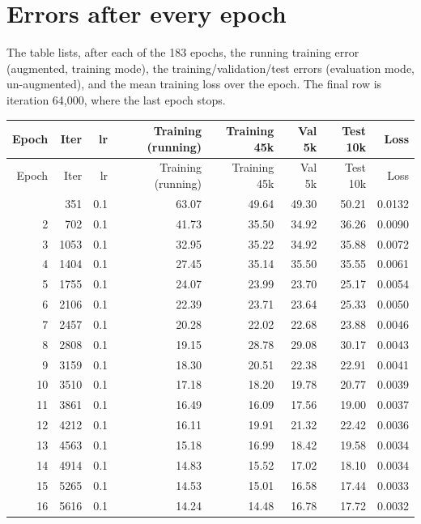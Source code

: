 \documentclass[11pt,a4paper]{article}
\begin{document}
\section{Errors after every epoch}

The table lists, after each of the 183 epochs, the running training error
(augmented, training mode), the training/validation/test errors (evaluation
mode, un-augmented), and the mean training loss over the epoch. The final row
is iteration 64{,}000, where the last epoch stops.

\begin{center}
\footnotesize
\begin{longtable}{@{}rrrrrrrr@{}}
\toprule
Epoch & Iter & lr & Training (running) & Training 45k & Val 5k & Test 10k & Loss \\
\midrule
\endfirsthead
\toprule
Epoch & Iter & lr & Training (running) & Training 45k & Val 5k & Test 10k & Loss \\
\midrule
\endhead
\bottomrule
\endfoot
1 & 351 & 0.1 & 63.07 & 49.64 & 49.30 & 50.21 & 0.0132 \\
2 & 702 & 0.1 & 41.73 & 35.50 & 34.92 & 36.26 & 0.0090 \\
3 & 1053 & 0.1 & 32.95 & 35.22 & 34.92 & 35.88 & 0.0072 \\
4 & 1404 & 0.1 & 27.45 & 35.14 & 35.50 & 35.55 & 0.0061 \\
5 & 1755 & 0.1 & 24.07 & 23.99 & 23.70 & 25.17 & 0.0054 \\
6 & 2106 & 0.1 & 22.39 & 23.71 & 23.64 & 25.33 & 0.0050 \\
7 & 2457 & 0.1 & 20.28 & 22.02 & 22.68 & 23.88 & 0.0046 \\
8 & 2808 & 0.1 & 19.15 & 28.78 & 29.08 & 30.17 & 0.0043 \\
9 & 3159 & 0.1 & 18.30 & 20.51 & 22.38 & 22.91 & 0.0041 \\
10 & 3510 & 0.1 & 17.18 & 18.20 & 19.78 & 20.77 & 0.0039 \\
11 & 3861 & 0.1 & 16.49 & 16.09 & 17.56 & 19.00 & 0.0037 \\
12 & 4212 & 0.1 & 16.11 & 19.91 & 21.32 & 22.42 & 0.0036 \\
13 & 4563 & 0.1 & 15.18 & 16.99 & 18.42 & 19.58 & 0.0034 \\
14 & 4914 & 0.1 & 14.83 & 15.52 & 17.02 & 18.10 & 0.0034 \\
15 & 5265 & 0.1 & 14.53 & 15.01 & 16.58 & 17.44 & 0.0033 \\
16 & 5616 & 0.1 & 14.24 & 14.48 & 16.78 & 17.72 & 0.0032 \\

\end{longtable}
\end{center}
\end{document}
